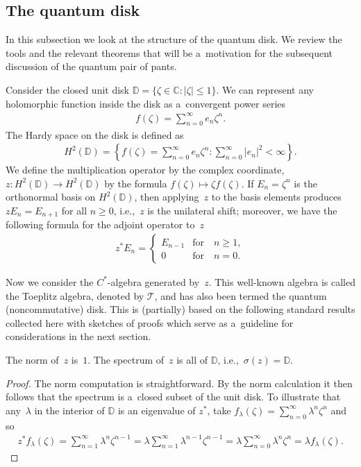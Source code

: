 
\subsection{The quantum disk}

In this subsection we look at the structure of the quantum disk.
We review the tools and the relevant theorems that will be a~motivation for the subsequent discussion of the quantum
pair of pants.

Consider the closed unit disk ${\mathbb D}=\{\zeta\in{\mathbb C}: |\zeta|\leq 1\}$.
We can represent any holomorphic function inside the disk as a~convergent power series
\begin{gather*}
f(\zeta)=\sum\limits_{n=0}^\infty e_n\zeta^n.
\end{gather*}
The Hardy space on the disk is def\/ined as
\begin{gather*}
H^2({\mathbb D})=\left\{f(\zeta)=\sum\limits_{n=0}^\infty e_n\zeta^n: \sum\limits_{n=0}^\infty|e_n|^2
<\infty\right\}.
\end{gather*}
We def\/ine the multiplication operator by the complex coordinate, $z:H^2({\mathbb D}) \to H^2({\mathbb D})$ by the
formula $f(\zeta)\mapsto \zeta f(\zeta)$.
If $E_n=\zeta^n$ is the orthonormal basis on $H^2({\mathbb D})$, then applying~$z$ to the basis elements produces
$zE_n=E_{n+1}$ for all $n \geq 0$, i.e.,~$z$ is the unilateral shift; moreover, we have the following formula for the adjoint operator to~$z$
\begin{gather*}
z^*E_n=
\begin{cases}
E_{n-1} &\text{for} \quad  n\ge 1,
\\
0  &\text{for} \quad n=0.
\end{cases}
\end{gather*}

Now we consider the $C^*$-algebra generated by~$z$.
This well-known algebra is called the Toeplitz algebra, denoted by $\mathcal{T}$, and has also been termed the quantum
(noncommutative) disk.
This is (partially) based on the following standard results collected here with sketches of proofs which serve as
a~guideline for considerations in the next section.

\begin{Theorem}
The norm of~$z$ is~$1$.
The spectrum of~$z$ is all of ${\mathbb D}$, i.e.,~$\sigma(z)={\mathbb D}$.
\end{Theorem}

\begin{proof}
The norm computation is straightforward.
By the norm calculation it then follows that the spectrum is a~closed subset of the unit disk.
To illustrate that any~$\lambda$ in the interior of ${\mathbb D}$ is an eigenvalue of $z^*$, take $f_\lambda(\zeta) =
\sum\limits_{n=0}^\infty \lambda^n \zeta^n$ and so
\begin{gather*}
z^*f_\lambda(\zeta)=\sum\limits_{n=1}^\infty \lambda^n \zeta^{n-1}=\lambda\sum\limits_{n=1}^\infty
\lambda^{n-1}\zeta^{n-1}=\lambda\sum\limits_{n=0}^\infty \lambda^n\zeta^n=\lambda f_\lambda(\zeta).\tag*{\qed}
\end{gather*}
\renewcommand{\qed}{}
\end{proof}

